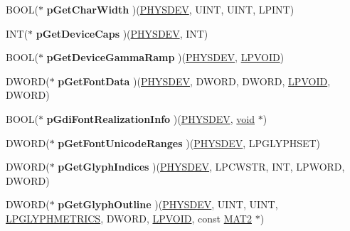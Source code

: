 \begin{DoxyCompactItemize}
\mbox{\label{structgdi__dc__funcs_a42a40293be034ee7702cb0779bfc3a1e}} 
B\+O\+OL($\ast$ {\bfseries p\+Get\+Char\+Width} )(\hyperlink{structgdi__physdev}{P\+H\+Y\+S\+D\+EV}, U\+I\+NT, U\+I\+NT, L\+P\+I\+NT)
\item 
\mbox{\label{structgdi__dc__funcs_a8afe261ab53f150ba930b43cd5453ae9}} 
I\+NT($\ast$ {\bfseries p\+Get\+Device\+Caps} )(\hyperlink{structgdi__physdev}{P\+H\+Y\+S\+D\+EV}, I\+NT)
\item 
\mbox{\label{structgdi__dc__funcs_a064672c1d5f52dd5a283b068763a5464}} 
B\+O\+OL($\ast$ {\bfseries p\+Get\+Device\+Gamma\+Ramp} )(\hyperlink{structgdi__physdev}{P\+H\+Y\+S\+D\+EV}, \hyperlink{interfacevoid}{L\+P\+V\+O\+ID})
\item 
\mbox{\label{structgdi__dc__funcs_aaa66186acf45c2826cb67055d547a951}} 
D\+W\+O\+RD($\ast$ {\bfseries p\+Get\+Font\+Data} )(\hyperlink{structgdi__physdev}{P\+H\+Y\+S\+D\+EV}, D\+W\+O\+RD, D\+W\+O\+RD, \hyperlink{interfacevoid}{L\+P\+V\+O\+ID}, D\+W\+O\+RD)
\item 
\mbox{\label{structgdi__dc__funcs_a3975759aaa17ba962df0b5ae5aa0b021}} 
B\+O\+OL($\ast$ {\bfseries p\+Gdi\+Font\+Realization\+Info} )(\hyperlink{structgdi__physdev}{P\+H\+Y\+S\+D\+EV}, \hyperlink{interfacevoid}{void} $\ast$)
\item 
\mbox{\label{structgdi__dc__funcs_a94b98e95d97650dbaa30e4237a88f1df}} 
D\+W\+O\+RD($\ast$ {\bfseries p\+Get\+Font\+Unicode\+Ranges} )(\hyperlink{structgdi__physdev}{P\+H\+Y\+S\+D\+EV}, L\+P\+G\+L\+Y\+P\+H\+S\+ET)
\item 
\mbox{\label{structgdi__dc__funcs_a6d35c3f152ff99a5631666d747710038}} 
D\+W\+O\+RD($\ast$ {\bfseries p\+Get\+Glyph\+Indices} )(\hyperlink{structgdi__physdev}{P\+H\+Y\+S\+D\+EV}, L\+P\+C\+W\+S\+TR, I\+NT, L\+P\+W\+O\+RD, D\+W\+O\+RD)
\item 
\mbox{\label{structgdi__dc__funcs_a8ba0a521142bbb712f9227f20f1b9334}} 
D\+W\+O\+RD($\ast$ {\bfseries p\+Get\+Glyph\+Outline} )(\hyperlink{structgdi__physdev}{P\+H\+Y\+S\+D\+EV}, U\+I\+NT, U\+I\+NT, \hyperlink{struct___g_l_y_p_h_m_e_t_r_i_c_s}{L\+P\+G\+L\+Y\+P\+H\+M\+E\+T\+R\+I\+CS}, D\+W\+O\+RD, \hyperlink{interfacevoid}{L\+P\+V\+O\+ID}, const \hyperlink{struct___m_a_t2}{M\+A\+T2} $\ast$)

\end{DoxyCompactItemize}
